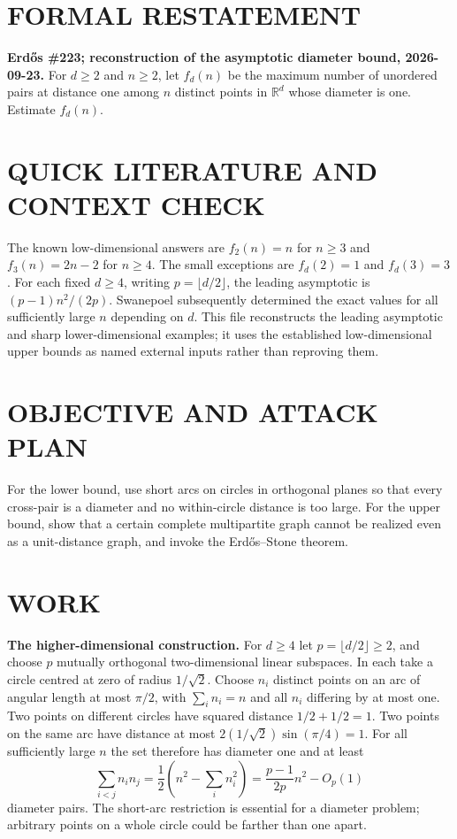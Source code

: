 \section{FORMAL RESTATEMENT}
\textbf{Erd\H{o}s \#223; reconstruction of the asymptotic diameter bound, 2026-09-23.}
For $d\geq2$ and $n\geq2$, let $f_d(n)$ be the maximum number of unordered pairs at distance one among $n$ distinct points in $\mathbb R^d$ whose diameter is one. Estimate $f_d(n)$.

\section{QUICK LITERATURE AND CONTEXT CHECK}
The known low-dimensional answers are $f_2(n)=n$ for $n\geq3$ and $f_3(n)=2n-2$ for $n\geq4$. The small exceptions are $f_d(2)=1$ and $f_d(3)=3$. For each fixed $d\geq4$, writing $p=\lfloor d/2\rfloor$, the leading asymptotic is $(p-1)n^2/(2p)$. Swanepoel subsequently determined the exact values for all sufficiently large $n$ depending on $d$. This file reconstructs the leading asymptotic and sharp lower-dimensional examples; it uses the established low-dimensional upper bounds as named external inputs rather than reproving them.

\section{OBJECTIVE AND ATTACK PLAN}
For the lower bound, use short arcs on circles in orthogonal planes so that every cross-pair is a diameter and no within-circle distance is too large. For the upper bound, show that a certain complete multipartite graph cannot be realized even as a unit-distance graph, and invoke the Erd\H{o}s--Stone theorem.

\section{WORK}
\textbf{The higher-dimensional construction.} For $d\geq4$ let $p=\lfloor d/2\rfloor\geq2$, and choose $p$ mutually orthogonal two-dimensional linear subspaces. In each take a circle centred at zero of radius $1/\sqrt2$. Choose $n_i$ distinct points on an arc of angular length at most $\pi/2$, with $\sum_i n_i=n$ and all $n_i$ differing by at most one. Two points on different circles have squared distance $1/2+1/2=1$. Two points on the same arc have distance at most $2(1/\sqrt2)\sin(\pi/4)=1$. For all sufficiently large $n$ the set therefore has diameter one and at least
\[
\sum_{i<j}n_i n_j
=\frac12\left(n^2-\sum_i n_i^2\right)
=\frac{p-1}{2p}n^2-O_p(1)
\tag{1}
\]
diameter pairs. The short-arc restriction is essential for a diameter problem; arbitrary points on a whole circle could be farther than one apart.

